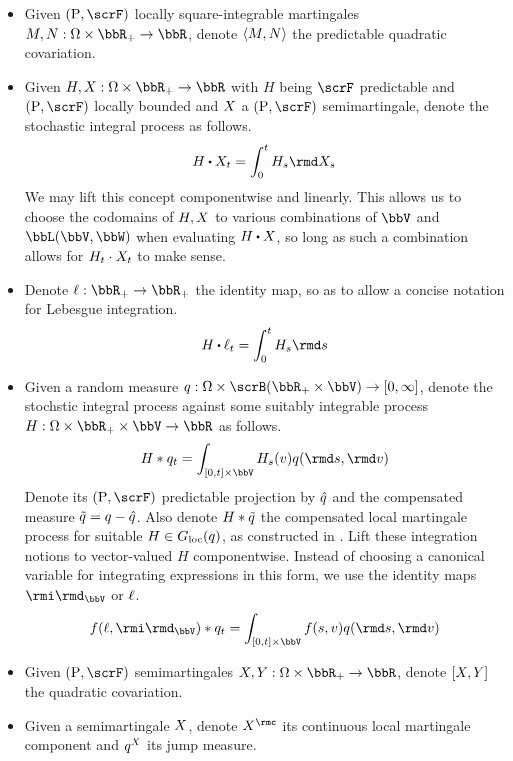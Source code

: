 \begin{itemize}
  \item
    Given $(\Prb,\scrF)$ locally square-integrable martingales $M, N: \Omega \times \bbR_+ \rightarrow \bbR$, denote ${\langle M , N \rangle}$ the predictable quadratic covariation.
  \item
    Given $H,\X: \Omega \times \bbR_+ \rightarrow \bbR$ with $H$ being $\scrF$ predictable and $(\Prb, \scrF)$ locally bounded and $X$ a $(\Prb, \scrF)$ semimartingale, denote the stochastic integral process as follows.
    \[
      H\shortInt \X_t = \int_0^t H_s \rmd\X_s
    \]
    We may lift this concept componentwise and linearly.
    This allows us to choose the codomains of $H, X$ to various combinations of $\vecSpace$ and $\bbL(\vecSpace, \bbW)$ when evaluating $H \shortInt \X$, so long as such a combination allows for $H_t \cdot X_t$ to make sense.
  \item
    Denote $\leb: \bbR_+ \rightarrow \bbR_+$ the identity map, so as to allow a concise notation for Lebesgue integration.
    \[
      H \shortInt \leb_t = \int_0^t H_s \rmd s
    \]
  \item
    Given a random measure $\jumpMeas: \Omega \times \scrB(\bbR_+ \times \vecSpace) \rightarrow [0,\infty]$, denote the stochstic integral process against some suitably integrable process $H: \Omega \times \bbR_+ \times \vecSpace \rightarrow \bbR$ as follows.
    \[
      H \ast \jumpMeas_t = \int_{[0,t] \times \vecSpace} H_s(\markVar) \jumpMeas(\rmd s, \rmd\markVar)
    \]
    Denote its $(\Prb, \scrF)$ predictable projection by $\hat{q}$ and the compensated measure $\tilde{q} = q - \hat{q}$.
    Also denote $H \ast \tilde{q}$ the compensated local martingale process for suitable $H \in G_{\operatorname{loc}}(q)$, as constructed in \cite[Definition II.1.27]{jacod2003}.
    Lift these integration notions to vector-valued $H$ componentwise.
    Instead of choosing a canonical variable for integrating expressions in this form, we use the identity maps $\id_\vecSpace$ or $\ell$.
    \[
      f(\leb, \id_\vecSpace) \ast \jumpMeas_t = \int_{[0,t] \times \vecSpace} f(s, \markVar) \jumpMeas(\rmd s, \rmd\markVar)
    \]
  \item
    Given $(\Prb, \scrF)$ semimartingales $\X, Y: \Omega \times \bbR_+ \rightarrow \bbR$, denote $[X,Y]$ the quadratic covariation.
  \item
    Given a semimartingale $X$, denote $\X^\rmc$ its continuous local martingale component and $q^X$ its jump measure.

\end{itemize}

